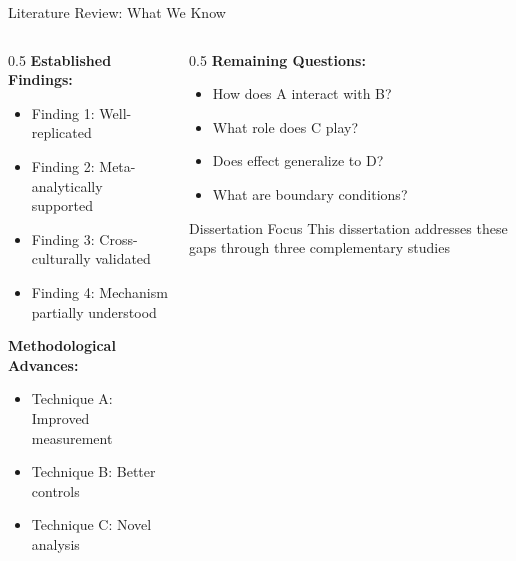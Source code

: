 \documentclass[aspectratio=169,12pt]{beamer}
\begin{document}
\begin{frame}{Literature Review: What We Know}
  \begin{columns}[T]

    \begin{column}{0.5\textwidth}
      \textbf{Established Findings:}
      \begin{itemize}
        \item Finding 1: Well-replicated
        \item Finding 2: Meta-analytically supported
        \item Finding 3: Cross-culturally validated
        \item Finding 4: Mechanism partially understood
      \end{itemize}

      \vspace{0.3cm}

      \textbf{Methodological Advances:}
      \begin{itemize}
        \item Technique A: Improved measurement
        \item Technique B: Better controls
        \item Technique C: Novel analysis
      \end{itemize}
    \end{column}

    \begin{column}{0.5\textwidth}
      \textbf{Remaining Questions:}
      \begin{itemize}
        \item[\alert{?}] How does A interact with B?
        \item[\alert{?}] What role does C play?
        \item[\alert{?}] Does effect generalize to D?
        \item[\alert{?}] What are boundary conditions?
      \end{itemize}

      \vspace{0.3cm}

      \begin{exampleblock}{Dissertation Focus}
        This dissertation addresses these gaps through three complementary studies
      \end{exampleblock}
    \end{column}

  \end{columns}
\end{frame}
\end{document}
